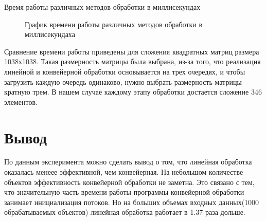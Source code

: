 \documentclass[12pt, a4paper]{report}
\begin{document}
	

	\begin{table}[ht!]
		\label{fig:table}
		\caption{Время работы различных методов обработки в миллисекундах}
		\begin{center}
		\end{center}
	\end{table}

	\begin{figure}[ht!]
		\label{fig:graph}
		\caption{График времени работы различных методов обработки в миллисекундаха}
	\end{figure}

	Сравнение времени работы приведены для сложения квадратных матриц размера 1038х1038. Такая размерность матрицы была выбрана, из-за того, что реализация линейной и конвейерной обработки основывается на трех очередях, и чтобы загрузить каждую очередь одинаково, нужно выбрать размерность матрицы кратную трем. В нашем случае каждому этапу обработки достается сложение 346 элементов.
	
	
	\section{Вывод}
	\hspace{0.5cm}По данным эксперимента можно сделать вывод о том, что линейная обработка оказалась менеее эффективной, чем конвейерная. На небольшом количестве объектов эффективность конвейерной обработки не заметна. Это связано с тем, что значительную часть времени работы программы конвейерной обработки занимает инициализация потоков. Но на больших объемах входных данных(1000 обрабатываемых объектов) линейная обработка работает в 1.37 раза дольше. 
\end{document}
